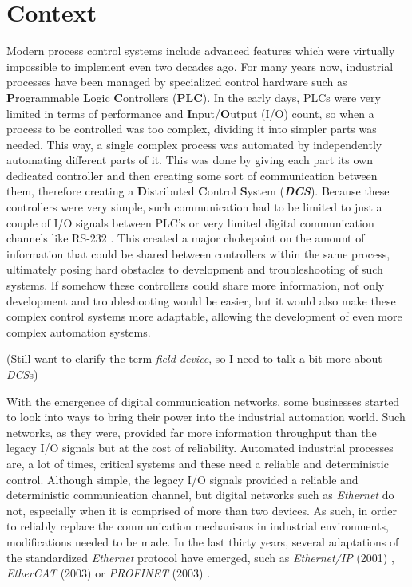 \section{Context} \label{sec:context}

Modern process control systems include advanced features which were virtually
impossible to implement even two decades ago. For many years now, industrial
processes have been managed by specialized control hardware such as \textbf
Programmable \textbf Logic \textbf Controllers ({\bfseries PLC}). In the early
days, PLCs were very limited in terms of performance and \textbf Input/\textbf
Output (I/O) count, so when a process to be controlled was too complex,
dividing it into simpler parts was needed. This way, a single complex process
was automated by independently automating different parts of it. This was done
by giving each part its own dedicated controller and then creating some sort of
communication between them, therefore creating a \textbf Distributed \textbf
Control \textbf System ({\bfseries\itshape DCS}). Because these controllers
were very simple, such communication had to be limited to just a couple of I/O
signals between PLC's or very limited digital communication channels like
RS-232 \cite{protocol:rs232}. This created a major chokepoint on the amount of
information that could be shared between controllers within the same process,
ultimately posing hard obstacles to development and troubleshooting of such
systems. If somehow these controllers could share more information, not only
development and troubleshooting would be easier, but it would also make these
complex control systems more adaptable, allowing the development of even more
complex automation systems.

(Still want to clarify the term \emph{field device}, so I need to talk a bit
more about \emph{DCS}s)

With the emergence of digital communication networks, some businesses started
to look into ways to bring their power into the industrial automation world.
Such networks, as they were, provided far more information throughput than the
legacy I/O signals but at the cost of reliability. Automated industrial
processes are, a lot of times, critical systems and these need a reliable and
deterministic control. Although simple, the legacy I/O signals provided a
reliable and deterministic communication channel, but digital networks such as
\emph{Ethernet} \cite{protocol:ethernet} do not, especially when it is
comprised of more than two devices. As such, in order to reliably replace the
communication mechanisms in industrial environments, modifications needed to be
made. In the last thirty years, several adaptations of the standardized
\emph{Ethernet} protocol have emerged, such as \emph{Ethernet/IP} (2001)
\cite{protocol:ethernetip}, \emph{EtherCAT} (2003) \cite{protocol:ethercat} or
\emph{PROFINET} (2003) \cite{protocol:profinet}.

